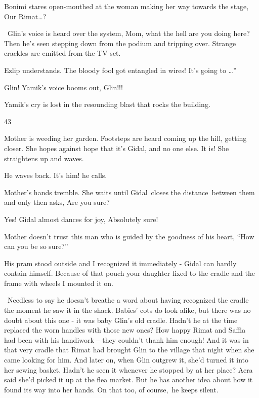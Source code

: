 \documentclass[12pt]{book}
\begin{document}
Bonimi stares open-mouthed at the woman making her way towards the stage, {\textquotedbl}Our
Rimat{\dots}?{\textquotedbl}

~Glin's voice is heard over the system, {\textquotedbl}Mom, what the hell are you doing here?{\textquotedbl} Then
he{{}'}s seen stepping down from the podium and tripping over. Strange crackles
are emitted from the TV set.

Ezlip understands. {\textquotedbl}The bloody fool got entangled in wires! It's going to {\dots}''

{\textquotedbl}Glin!{\textquotedbl} Yamik's voice booms{ }out,
{\textquotedbl}Glin!!!{\textquotedbl}

Yamik's cry is lost in the resounding blast that rocks the building.


\bigskip

43

Mother is weeding her garden. Footsteps are heard coming up the hill, getting closer. She hopes against hope that it's
Gidal, and{ }no one else. It is! She straightens up and waves.

He waves back. {\textquotedbl}It's him!{\textquotedbl} he calls.

Mother's hands tremble. She waits until Gidal~closes the distance~between them and only then
asks,{ }{\textquotedbl}Are you sure?{\textquotedbl}

{\textquotedbl}Yes!{\textquotedbl} Gidal almost dances for joy, {\textquotedbl}Absolutely sure!{\textquotedbl}

Mother doesn't trust this man who is guided by the goodness of his heart, ``How can you be so sure?''

{\textquotedbl}His pram stood outside and I recognized it immediately -{\textquotedbl} Gidal can hardly contain himself.
{\textquotedbl}Because of that pouch your daughter fixed to the cradle and the frame with wheels I mounted it
on.{\textquotedbl}

~Needless to say he doesn't breathe a word about having recognized the cradle the moment he saw it in the shack. Babies'
cots do look alike, but there was no doubt about this one - it was baby Glin's old cradle. Hadn't he at the time
replaced the worn handles with those new ones? How happy Rimat and Saffia had been with his handiwork -- they couldn't
thank him enough!{ }And it was in that very cradle that Rimat had
brought{ }Glin to the village that night when she came looking for him. And
later on, when Glin outgrew it, she'd turned it into her sewing basket. Hadn't he seen it whenever he stopped
by{ }at{ }her place? Aera said she'd picked it up at the flea market. But he has another
idea about how it found its way into her hands. On that too, of course,~he keeps silent. ~~
\end{document}
